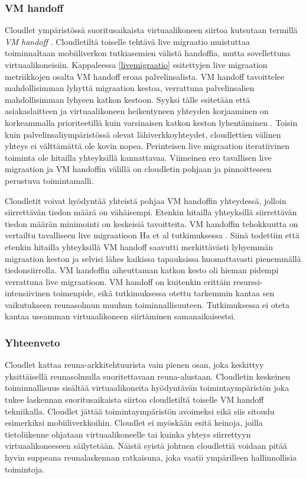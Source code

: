 \subsubsection*{VM handoff} \label{vmhandoff}

Cloudlet ympäristössä suoritusaikaista virtuaalikoneen siirtoa kutsutaan termillä \textit{VM handoff} \cite{ha2015adaptive}. Cloudletiltä toiselle tehtävä live migraatio muistuttaa toiminnaltaan mobiiliverkon tutkiasemien välistä handoffia, mutta sovellettuna virtuaalikoneisiin.
Kappaleessa \ref{livemigraatio} esitettyjen live migraation metriikkojen osalta VM handoff eroaa palvelinsalista. VM handoff tavoittelee mahdollisimman lyhyttä migraation kestoa, verrattuna palvelinsalien mahdollisimman lyhyeen katkon kestoon.
Syyksi tälle esitetään että asiakaslaitteen ja virtuaalikoneen heikentyneen yhteyden korjaaminen on korkeammalla prioriteetillä kuin varsinaisen katkon keston lyhentäminen \cite{ha2015adaptive}.
Toisin kuin palvelinsaliympäristössä olevat lähiverkkoyhteydet, cloudlettien välinen yhteys ei välttämättä ole kovin nopea. 
Perinteisen live migraation iteratiivinen toiminta ole hitailla yhteyksillä kannattavaa. 
Viimeinen ero tavallisen live migraation ja VM handoffin välillä on cloudletin pohjaan ja pinnoitteseen perustuva toimintamalli.

Cloudletit voivat hyödyntää yhteistä pohjaa VM handoffin yhteydessä, jolloin siirrettävän tiedon määrä on vähäisempi. 
Etenkin hitailla yhteyksillä siirrettävän tiedon määrän minimointi on keskeisiä tavoitteita. 
VM handoffin tehokkuutta on vertailtu tavalliseen live migraatioon Ha et al tutkimuksessa \cite{ha2017you}. Siinä todettiin että etenkin hitailla yhteyksillä VM handoff saavutti merkittävästi lyhyemmän migraation keston ja selvisi lähes kaikissa tapauksissa huomattavasti pienemmällä tiedonsiirrolla. VM handoffin aiheuttaman katkon kesto oli hieman pidempi verrattuna live migraatioon. 
VM handoff on kuitenkin erittäin resurssi-intensiivinen toimenpide, eikä tutkimuksessa otettu tarkemmin kantaa sen vaikutukseen reunasolmun muuhun toiminnallisuuteen.
Tutkimuksessa ei oteta kantaa useamman virtuaalikoneen siirtäminen samanaikaisestsi. 
\subsubsection*{Yhteenveto}
Cloudlet kattaa reuna-arkkitehtuurista vain pienen osan, joka keskittyy yksittäisellä reunasolmulla suoritettavaan reuna-alustaan. Cloudletin keskeinen toiminnallisuus sisältää virtuaalikoneita hyödyntävän toimintaympäristön joka tukee laskennan suoritusaikaista siirtoa cloudletiltä toiselle VM handoff tekniikalla. 
Cloudlet jättää toimintaympäristön avoimeksi eikä siis sitoudu esimerkiksi mobiiliverkkoihin.
Cloudlet ei myöskään esitä keinoja, joilla tietoliikenne ohjataan virtuaalikoneelle tai kuinka yhteys siirrettyyn virtuaalikoneeseen säilytetään. 
Näistä syistä johtuen cloudlettiä voidaan pitää hyvin suppeana reunalaskennan ratkaisuna, joka vaatii ympärilleen hallinnollisia toimintoja.
